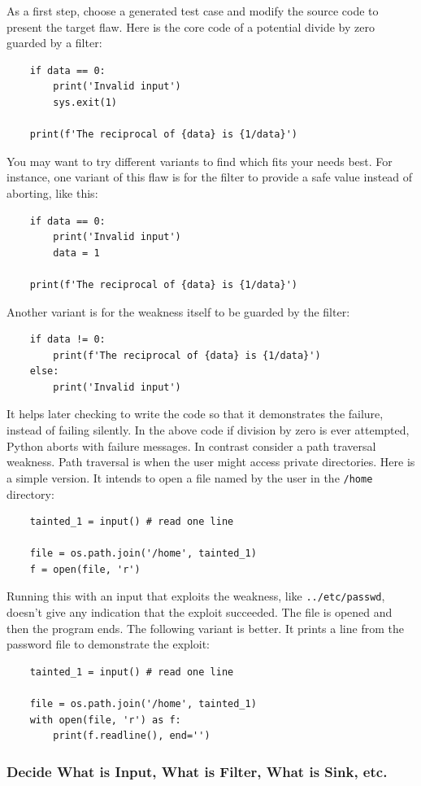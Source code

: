 As a first step, choose a generated test case and modify the source code to present
the target flaw.  Here is the core code of
a potential divide by zero guarded by a filter:
\begin{verbatim}
    if data == 0:
        print('Invalid input')
        sys.exit(1)

    print(f'The reciprocal of {data} is {1/data}')
\end{verbatim}
You may want to try different variants to find which fits your needs best.  For
instance, one variant of this flaw is for the filter to provide a safe value instead
of aborting, like this:
\begin{verbatim}
    if data == 0:
        print('Invalid input')
        data = 1

    print(f'The reciprocal of {data} is {1/data}')
\end{verbatim}
Another variant is for the weakness itself to be guarded by the filter:
\begin{verbatim}
    if data != 0:
        print(f'The reciprocal of {data} is {1/data}')
    else:
        print('Invalid input')
\end{verbatim}

It helps later checking to write the code so that it demonstrates the failure,
instead of
failing silently.  In the above code if division by zero is ever attempted, Python
aborts with failure messages.  In contrast consider a path traversal weakness.  Path
traversal is when the user might access private directories.  Here is a simple
version.  It intends to open a file named by the user in the \verb|/home| directory:
\begin{verbatim}
    tainted_1 = input() # read one line

    file = os.path.join('/home', tainted_1)
    f = open(file, 'r')
\end{verbatim}
Running this with an input that exploits the weakness, like
\verb|../etc/passwd|, doesn't give any indication that the exploit succeeded.  The
file is opened and then the program ends.  The following variant is better.  It
prints a line from the password file to demonstrate the exploit:
\begin{verbatim}
    tainted_1 = input() # read one line

    file = os.path.join('/home', tainted_1)
    with open(file, 'r') as f:
        print(f.readline(), end='')
\end{verbatim}


\subsubsection{Decide What is Input, What is Filter, What is Sink, etc.}

